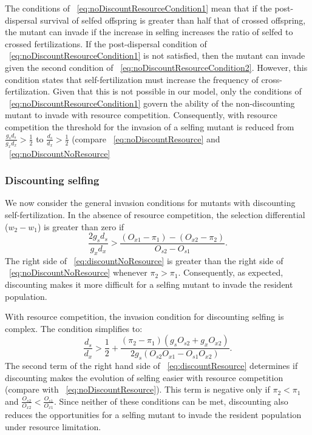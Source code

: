 \documentclass[letterpaper,titlepage]{scrartcl}
\begin{document}
The conditions of {\eref}~\ref{eq:noDiscountResourceCondition1} mean
that if the post-dispersal survival of selfed offspring is greater
than half that of crossed offspring, the mutant can invade if the
increase in selfing increases the ratio of selfed to crossed
fertilizations. If the post-dispersal condition of
{\eref}~\ref{eq:noDiscountResourceCondition1} is not satisfied, then
the mutant can invade given the second condition of
{\eref}~\ref{eq:noDiscountResourceCondition2}. However, this condition
states that self-fertilization must increase the frequency of
cross-fertilization. Given that this is not possible in our model,
only the conditions of {\eref}~\ref{eq:noDiscountResourceCondition1}
govern the ability of the non-discounting mutant to invade with
resource competition. Consequently, with resource competition the
threshold for the invasion of a selfing mutant is reduced from
$\frac{g_{s}d_{s}}{g_{x}d_{x}} > \frac{1}{2}$ to $\frac{d_{s}}{d_{x}}
> \frac{1}{2}$ (compare {\eref}~\eqref{eq:noDiscountResource} and {\eref}~\eqref{eq:noDiscountNoResource}

\subsubsection{Discounting selfing}
We now consider the general invasion conditions for mutants with
discounting self-fertilization. In the absence of resource
competition, the selection differential ($w_{2}-w_{1}$) is greater
than zero if
\begin{equation}\label{eq:discountNoResource}
  \frac{2g_{s}d_{s}}{g_{x}d_{x}}>\frac{(O_{x1}-\pi_{1})-(O_{x2}-\pi_{2})}{O_{s2}-O_{s1}}.
\end{equation}
The right side of {\eref}~\eqref{eq:discountNoResource} is greater than
the right side of {\eref}~\eqref{eq:noDiscountNoResource} whenever
$\pi_{2}>\pi_{1}$. Consequently, as expected, discounting makes it
more difficult for a selfing mutant to invade the resident population.

With resource competition, the invasion condition for discounting
selfing is complex. The condition simplifies to:
\begin{equation}\label{eq:discountResource}
  \frac{d_{s}}{d_{x}}>\frac{1}{2}+\frac{(\pi_{2}-\pi_{1})(g_{s}O_{s2}+g_{x}O_{x2})}{2g_{s}(O_{s2}O_{x1}-O_{s1}O_{x2})}.
\end{equation}
The second term of the right hand side of
{\eref}~\eqref{eq:discountResource} determines if discounting makes the
evolution of selfing easier with resource competition (compare with
{\eref}~\eqref{eq:noDiscountResource}). This term is negative only if
$\pi_{2}<\pi_{1}$ and
$\frac{O_{s2}}{O_{x2}}<\frac{O_{s1}}{O_{x1}}$. Since neither of these
conditions can be met, discounting also reduces the opportunities for
a selfing mutant to invade the resident population under resource
limitation.
\end{document}
